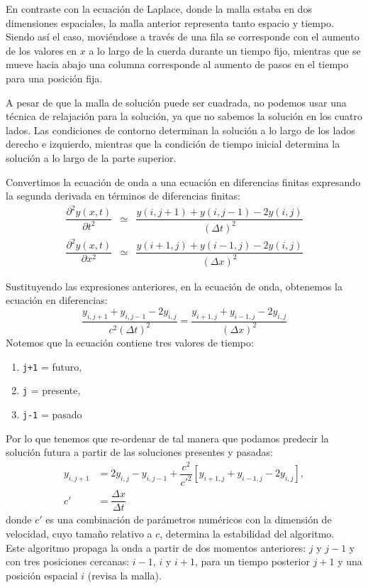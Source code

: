 \begin{frame}
En contraste con la ecuación de Laplace, donde la malla estaba en dos dimensiones espaciales, la malla anterior representa tanto espacio y tiempo. Siendo así el caso, moviéndose a través de una fila se corresponde con el aumento de los valores en $x$ a lo largo de la cuerda durante un tiempo fijo, mientras que se mueve hacia abajo una columna corresponde al aumento de pasos en el tiempo para una posición fija.
\end{frame}
\begin{frame}
A pesar de que la malla de solución puede ser cuadrada, no podemos usar una técnica de relajación para la solución, ya que no sabemos la solución en los cuatro lados. Las condiciones de contorno determinan la solución a lo largo de los lados derecho e izquierdo, mientras que la condición de tiempo inicial determina la solución a lo largo de la parte superior.
\end{frame}
\begin{frame}
Convertimos la ecuación de onda a una ecuación en diferencias finitas expresando la segunda derivada en términos de diferencias finitas:
\begin{eqnarray*}
\dfrac{\partial^{2} y(x,t)}{\partial t^{2}} & \simeq & \dfrac{y(i,j+1) + y(i,j-1) - 2y(i,j)}{(\Delta t)^{2}} \\
\dfrac{\partial^{2} y(x,t)}{\partial x^{2}} & \simeq & \dfrac{y(i+1,j) + y(i-1,j) - 2y(i,j)}{(\Delta x)^{2}}
\end{eqnarray*}
\end{frame}
\begin{frame}
Sustituyendo las expresiones anteriores, en la ecuación de onda, obtenemos la ecuación en diferencias:
\[ \dfrac{y_{i,j+1} + y_{i,j-1} - 2 y_{i,j}}{c^{2} (\Delta t)^{2}} = \dfrac{y_{i+1,j} + y_{i-1,j} - 2 y_{i,j}}{(\Delta x)^{2}} \]
Notemos que la ecuación contiene tres valores de tiempo:
\begin{enumerate}
\item \texttt{j+1} = futuro,
\item \texttt{j} = presente,
\item \texttt{j-1} = pasado
\end{enumerate}
\end{frame}
\begin{frame}
Por lo que tenemos que re-ordenar de tal manera que podamos predecir la solución futura a partir de las soluciones presentes y pasadas:
\[ \begin{split} y_{i,j+1} &= 2 y_{i,j} - y_{i,j-1} + \dfrac{c^{2}}{c'^{2}} \left[ y_{i+1,j} + y_{i-1,j} - 2 y_{i,j} \right], \\
 c' &= \dfrac{\Delta x}{\Delta t} \end{split} \]
donde $c'$ es una combinación de parámetros numéricos con la dimensión de velocidad, cuyo tamaño relativo a $c$, determina la estabilidad del algoritmo.
\\
\medskip 
Este algoritmo propaga la onda a partir de dos momentos anteriores: $j$ y $j-1$ y con tres posiciones cercanas: $i-1$, $i$ y $i+1$, para un tiempo posterior $j+1$ y una posición espacial $i$ (revisa la malla).
\end{frame}
